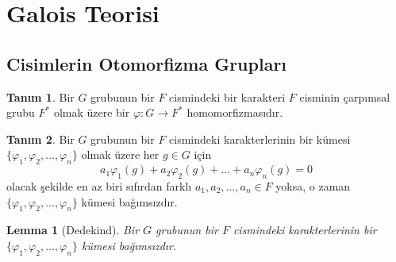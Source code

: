 \documentclass[draft]{article}
\newtheorem{lem}[thm]{Lemma}
\theoremstyle{definition}
\newtheorem{defn}{Tanım}[section]
\theoremstyle{remark}
\begin{document}
    \section{Galois Teorisi}
    	
    	\subsection{Cisimlerin Otomorfizma Grupları}
    	
    	    \begin{defn}
    	        Bir $G$ grubunun bir $F$ cismindeki bir karakteri $F$ cisminin çarpımsal grubu $F^*$ olmak üzere bir $\varphi : G \to F^*$ homomorfizmasıdır.
	    	\end{defn}
	    	
		    \begin{defn}
		        Bir $G$ grubunun bir $F$ cismindeki karakterlerinin bir kümesi\\$\{\varphi_1, \varphi_2, \dots, \varphi_n\}$ olmak üzere her $g \in G$ için
		        \begin{equation*}
				    a_1\varphi_1(g) + a_2\varphi_2(g) + \dots + a_n\varphi_n(g) = 0
		    	\end{equation*}
		    	olacak şekilde en az biri sıfırdan farklı $a_1, a_2, \dots, a_n \in F$ yoksa, o zaman $\{\varphi_1, \varphi_2, \dots, \varphi_n\}$ kümesi bağımsızdır.
		    \end{defn}
    	    
        	\begin{lem}[Dedekind]
        	    Bir $G$ grubunun bir $F$ cismindeki karakterlerinin bir $\{\varphi_1, \varphi_2, \dots, \varphi_n\}$ kümesi bağımsızdır.
    		\end{lem}
    		
\end{document}
